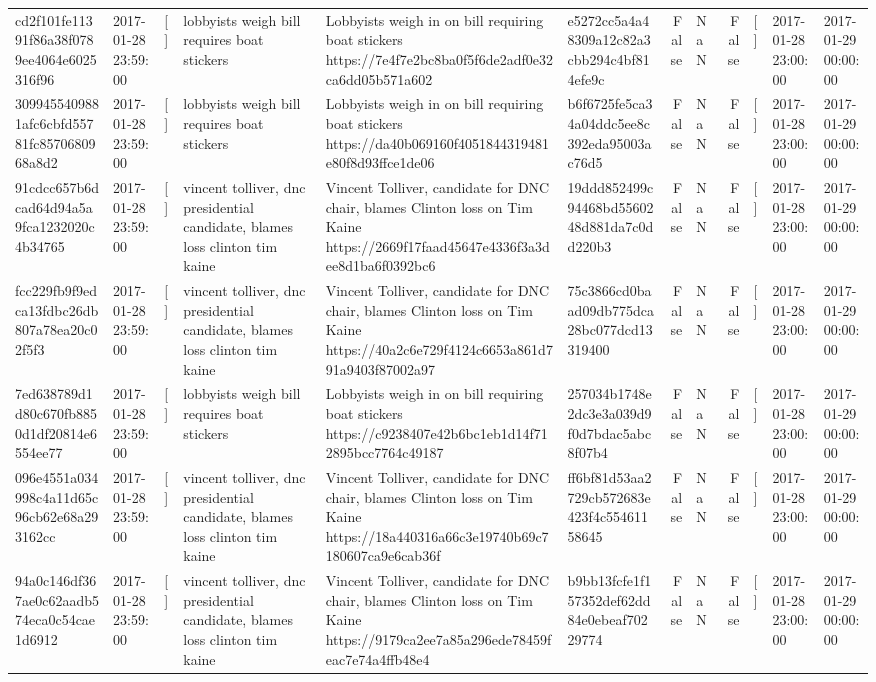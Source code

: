 \begin{tabular}{llllllrlrlll}
cd2f101fe11391f86a38f0789ee4064e6025316f96 & 2017-01-28 23:59:00 & [] & lobbyists weigh bill requires boat stickers & Lobbyists weigh in on bill requiring boat stickers https://7e4f7e2bc8ba0f5f6de2adf0e32ca6dd05b571a602 & e5272cc5a4a48309a12c82a3cbb294c4bf814efe9c & False & NaN & False & [] & 2017-01-28 23:00:00 & 2017-01-29 00:00:00 \\
3099455409881afc6cbfd55781fc8570680968a8d2 & 2017-01-28 23:59:00 & [] & lobbyists weigh bill requires boat stickers & Lobbyists weigh in on bill requiring boat stickers https://da40b069160f4051844319481e80f8d93ffce1de06 & b6f6725fe5ca34a04ddc5ee8c392eda95003ac76d5 & False & NaN & False & [] & 2017-01-28 23:00:00 & 2017-01-29 00:00:00 \\
91cdcc657b6dcad64d94a5a9fca1232020c4b34765 & 2017-01-28 23:59:00 & [] & vincent tolliver, dnc presidential candidate, blames loss clinton tim kaine & Vincent Tolliver, candidate for DNC chair, blames Clinton loss on Tim Kaine https://2669f17faad45647e4336f3a3dee8d1ba6f0392bc6 & 19ddd852499c94468bd5560248d881da7c0dd220b3 & False & NaN & False & [] & 2017-01-28 23:00:00 & 2017-01-29 00:00:00 \\
fcc229fb9f9edca13fdbc26db807a78ea20c02f5f3 & 2017-01-28 23:59:00 & [] & vincent tolliver, dnc presidential candidate, blames loss clinton tim kaine & Vincent Tolliver, candidate for DNC chair, blames Clinton loss on Tim Kaine https://40a2c6e729f4124c6653a861d791a9403f87002a97 & 75c3866cd0baad09db775dca28bc077dcd13319400 & False & NaN & False & [] & 2017-01-28 23:00:00 & 2017-01-29 00:00:00 \\
7ed638789d1d80c670fb8850d1df20814e6554ee77 & 2017-01-28 23:59:00 & [] & lobbyists weigh bill requires boat stickers & Lobbyists weigh in on bill requiring boat stickers https://c9238407e42b6bc1eb1d14f712895bcc7764c49187 & 257034b1748e2dc3e3a039d9f0d7bdac5abc8f07b4 & False & NaN & False & [] & 2017-01-28 23:00:00 & 2017-01-29 00:00:00 \\
096e4551a034998c4a11d65c96cb62e68a293162cc & 2017-01-28 23:59:00 & [] & vincent tolliver, dnc presidential candidate, blames loss clinton tim kaine & Vincent Tolliver, candidate for DNC chair, blames Clinton loss on Tim Kaine https://18a440316a66c3e19740b69c7180607ca9e6cab36f & ff6bf81d53aa2729cb572683e423f4c55461158645 & False & NaN & False & [] & 2017-01-28 23:00:00 & 2017-01-29 00:00:00 \\
94a0c146df367ae0c62aadb574eca0c54cae1d6912 & 2017-01-28 23:59:00 & [] & vincent tolliver, dnc presidential candidate, blames loss clinton tim kaine & Vincent Tolliver, candidate for DNC chair, blames Clinton loss on Tim Kaine https://9179ca2ee7a85a296ede78459feac7e74a4ffb48e4 & b9bb13fcfe1f157352def62dd84e0ebeaf70229774 & False & NaN & False & [] & 2017-01-28 23:00:00 & 2017-01-29 00:00:00 \\

\end{tabular}
